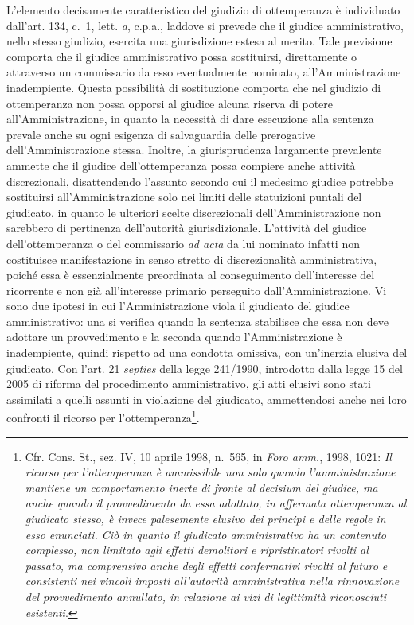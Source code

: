 \documentclass[12pt,it,a4paper,]{report}
\begin{document}
L'elemento decisamente caratteristico del giudizio di ottemperanza è
individuato dall'art. 134, c.~1, lett. \emph{a}, c.p.a., laddove si
prevede che il giudice amministrativo, nello stesso giudizio, esercita
una giurisdizione estesa al merito. Tale previsione comporta che il
giudice amministrativo possa sostituirsi, direttamente o attraverso un
commissario da esso eventualmente nominato, all'Amministrazione
inadempiente. Questa possibilità di sostituzione comporta che nel
giudizio di ottemperanza non possa opporsi al giudice alcuna riserva di
potere all'Amministrazione, in quanto la necessità di dare esecuzione
alla sentenza prevale anche su ogni esigenza di salvaguardia delle
prerogative dell'Amministrazione stessa. Inoltre, la giurisprudenza
largamente prevalente ammette che il giudice dell'ottemperanza possa
compiere anche attività discrezionali, disattendendo l'assunto secondo
cui il medesimo giudice potrebbe sostituirsi all'Amministrazione solo
nei limiti delle statuizioni puntali del giudicato, in quanto le
ulteriori scelte discrezionali dell'Amministrazione non sarebbero di
pertinenza dell'autorità giurisdizionale. L'attività del giudice
dell'ottemperanza o del commissario \emph{ad acta} da lui nominato
infatti non costituisce manifestazione in senso stretto di
discrezionalità amministrativa, poiché essa è essenzialmente preordinata
al conseguimento dell'interesse del ricorrente e non già all'interesse
primario perseguito dall'Amministrazione. Vi sono due ipotesi in cui
l'Amministrazione viola il giudicato del giudice amministrativo: una si
verifica quando la sentenza stabilisce che essa non deve adottare un
provvedimento e la seconda quando l'Amministrazione è inadempiente,
quindi rispetto ad una condotta omissiva, con un'inerzia elusiva del
giudicato. Con l'art. 21 \emph{septies} della legge 241/1990, introdotto
dalla legge 15 del 2005 di riforma del procedimento amministrativo, gli
atti elusivi sono stati assimilati a quelli assunti in violazione del
giudicato, ammettendosi anche nei loro confronti il ricorso per
l'ottemperanza\footnote{Cfr. Cons. St., sez. IV, 10 aprile 1998, n.~565,
  in \emph{Foro amm.}, 1998, 1021: \emph{Il ricorso per l'ottemperanza è
  ammissibile non solo quando l'amministrazione mantiene un
  comportamento inerte di fronte al decisium del giudice, ma anche
  quando il provvedimento da essa adottato, in affermata ottemperanza al
  giudicato stesso, è invece palesemente elusivo dei principi e delle
  regole in esso enunciati. Ciò in quanto il giudicato amministrativo ha
  un contenuto complesso, non limitato agli effetti demolitori e
  ripristinatori rivolti al passato, ma comprensivo anche degli effetti
  confermativi rivolti al futuro e consistenti nei vincoli imposti
  all'autorità amministrativa nella rinnovazione del provvedimento
  annullato, in relazione ai vizi di legittimità riconosciuti
  esistenti}.}.
\end{document}
